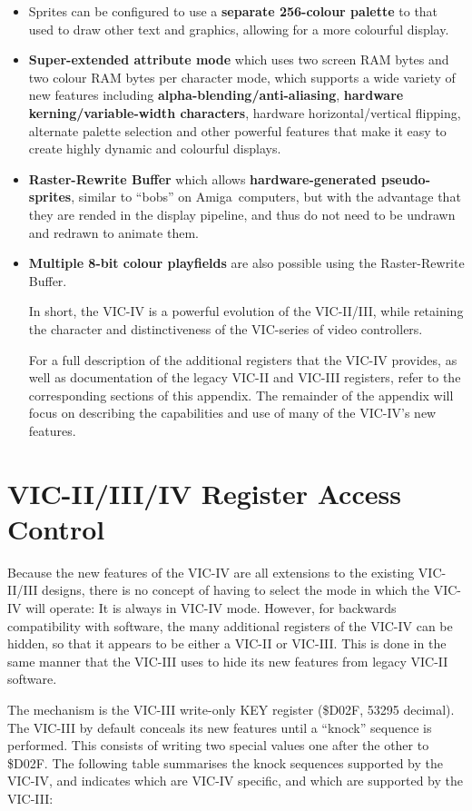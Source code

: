 \begin{itemize}
  \item Sprites can be configured to use a {\bf separate 256-colour palette} to that used to draw other text and graphics, allowing for a more colourful display.
  \item {\bf Super-extended attribute mode} which uses two screen RAM bytes and two colour RAM bytes per character mode, which supports a wide variety of new features including {\bf alpha-blending/anti-aliasing}, {\bf hardware kerning/variable-width characters}, hardware horizontal/vertical flipping, alternate palette selection and other powerful features that make it easy to create highly dynamic and colourful displays.
  \item {\bf Raster-Rewrite Buffer} which allows {\bf hardware-generated pseudo-sprites}, similar to ``bobs'' on Amiga\texttrademark \ computers, but with the advantage that they are rended in the display pipeline, and thus do not need to be undrawn and redrawn to animate them.
    \item {\bf Multiple 8-bit colour playfields} are also possible using the Raster-Rewrite Buffer.

      In short, the VIC-IV is a powerful evolution of the VIC-II/III, while retaining the character and distinctiveness of the VIC-series of
      video controllers.

      For a full description of the additional registers that the VIC-IV provides, as well as documentation of the legacy VIC-II and VIC-III registers, refer to the corresponding sections of this appendix. The remainder of the appendix will focus on describing the capabilities and use of many of the VIC-IV's new features.
\end{itemize}

\section{VIC-II/III/IV Register Access Control}
Because the new features of the VIC-IV are all extensions to the existing VIC-II/III designs, there is no concept of having to select the mode in which the VIC-IV will operate: It is always in VIC-IV mode. However, for backwards compatibility with software, the many additional registers of the VIC-IV can be hidden, so that it appears to be either a VIC-II or VIC-III. This is done in the same manner that the VIC-III uses to hide its new features from legacy VIC-II software.

 The mechanism is the VIC-III write-only KEY register (\$D02F, 53295 decimal).  The VIC-III by default conceals its new features until a ``knock'' sequence is performed.  This consists of writing two special values one after the other to \$D02F.  The following table summarises the knock sequences supported by the VIC-IV, and indicates which are VIC-IV specific, and which are supported by the VIC-III:

